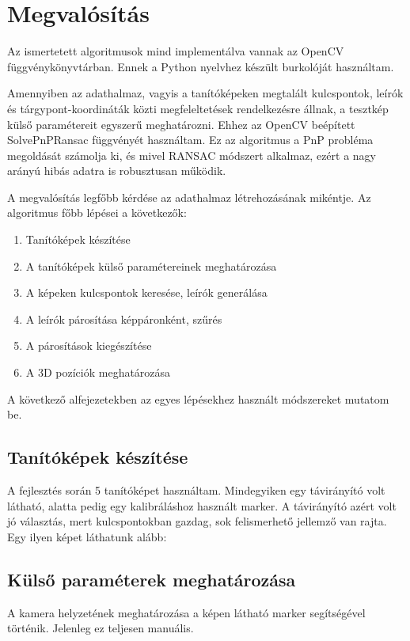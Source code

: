 \documentclass{article}
\begin{document}
	\section{Megvalósítás}

	Az ismertetett algoritmusok mind implementálva vannak az OpenCV függvénykönyvtárban. Ennek a Python nyelvhez készült burkolóját használtam.
	
	Amennyiben az adathalmaz, vagyis a tanítóképeken megtalált kulcspontok, leírók és tárgypont-koordináták közti megfeleltetések rendelkezésre állnak, a tesztkép külső paramétereit egyszerű meghatározni. Ehhez az OpenCV beépített SolvePnPRansac függvényét használtam. Ez az algoritmus a PnP probléma megoldását számolja ki, és mivel RANSAC módszert alkalmaz, ezért a nagy arányú hibás adatra is robusztusan működik.
	
	A megvalósítás legfőbb kérdése az adathalmaz létrehozásának mikéntje. Az algoritmus főbb lépései a következők:
	
	\begin{enumerate}
	\item Tanítóképek készítése
	\item A tanítóképek külső paramétereinek meghatározása
	\item A képeken kulcspontok keresése, leírók generálása
	\item A leírók párosítása képpáronként, szűrés
	\item A párosítások kiegészítése
	\item A 3D pozíciók meghatározása
	\end{enumerate}
	
	A következő alfejezetekben az egyes lépésekhez használt módszereket mutatom be.
	\subsection{Tanítóképek készítése}
	A fejlesztés során 5 tanítóképet használtam. Mindegyiken egy távirányító volt látható, alatta pedig egy kalibráláshoz használt marker. A távirányító azért volt jó választás, mert kulcspontokban gazdag, sok felismerhető jellemző van rajta. Egy ilyen képet láthatunk alább:
	
	
	\subsection{Külső paraméterek meghatározása}
	A kamera helyzetének meghatározása a képen látható marker segítségével történik. Jelenleg ez teljesen manuális.
	
\end{document}
